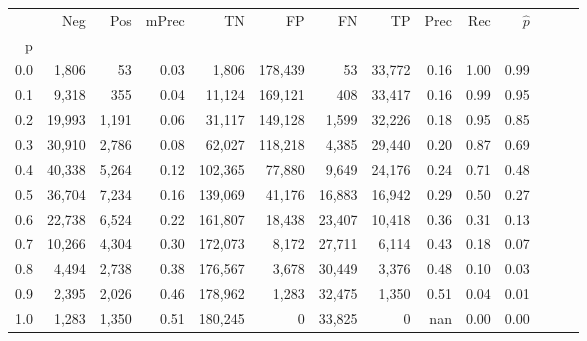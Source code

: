 \begin{tabular}{rrrrrrrrrrrrrr}
\toprule
{} &     Neg &    Pos & mPrec &       TN &       FP &      FN &      TP &  Prec &   Rec & $\hat{p}$ \\
p   &         &        &       &          &          &         &         &       &       &           \\
\midrule
0.0 &   1,806 &     53 &  0.03 &    1,806 &  178,439 &      53 &  33,772 &  0.16 &  1.00 &      0.99 \\
0.1 &   9,318 &    355 &  0.04 &   11,124 &  169,121 &     408 &  33,417 &  0.16 &  0.99 &      0.95 \\
0.2 &  19,993 &  1,191 &  0.06 &   31,117 &  149,128 &   1,599 &  32,226 &  0.18 &  0.95 &      0.85 \\
0.3 &  30,910 &  2,786 &  0.08 &   62,027 &  118,218 &   4,385 &  29,440 &  0.20 &  0.87 &      0.69 \\
0.4 &  40,338 &  5,264 &  0.12 &  102,365 &   77,880 &   9,649 &  24,176 &  0.24 &  0.71 &      0.48 \\
0.5 &  36,704 &  7,234 &  0.16 &  139,069 &   41,176 &  16,883 &  16,942 &  0.29 &  0.50 &      0.27 \\
0.6 &  22,738 &  6,524 &  0.22 &  161,807 &   18,438 &  23,407 &  10,418 &  0.36 &  0.31 &      0.13 \\
0.7 &  10,266 &  4,304 &  0.30 &  172,073 &    8,172 &  27,711 &   6,114 &  0.43 &  0.18 &      0.07 \\
0.8 &   4,494 &  2,738 &  0.38 &  176,567 &    3,678 &  30,449 &   3,376 &  0.48 &  0.10 &      0.03 \\
0.9 &   2,395 &  2,026 &  0.46 &  178,962 &    1,283 &  32,475 &   1,350 &  0.51 &  0.04 &      0.01 \\
1.0 &   1,283 &  1,350 &  0.51 &  180,245 &        0 &  33,825 &       0 &   nan &  0.00 &      0.00 \\
\bottomrule
\end{tabular}
